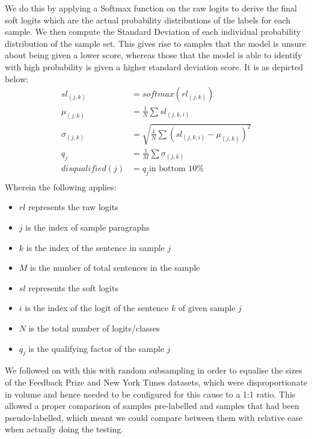 \documentclass[12pt]{article}
\begin{document}
{We do this by applying a Softmax function on the raw logits to derive the final soft logits which are the actual probability distributions of the labels for each sample. We then compute the Standard Deviation of each individual probability distribution of the sample set. This gives rise to samples that the model is unsure about being given a lower score, whereas those that the model is able to identify with high probability is given a higher standard deviation score. It is as depicted below:
\begin{align*}
    sl_{(j,k)} &= softmax(rl_{(j,k)}) \\
    \mu_{(j,k)} &= \frac{1}{N} \sum sl_{(j,k,i)} \\
    \sigma_{(j,k)} &= \sqrt{\frac{1}{N} \sum \left(sl_{(j,k,i)} - \mu_{(j,k)} \right)^2} \\
    q_j &= \frac{1}{M} \sum \sigma_{(j, k)} \\
    disqualified(j) &= q_j \text{in bottom 10\%} \\
\end{align*}
Wherein the following applies:
\begin{multicols}{2}
\begin{itemize}
    \item $rl$ represents the raw logits
    \item $j$ is the index of sample paragraphs
    \item $k$ is the index of the sentence in sample $j$
    \item $M$ is the number of total sentences in the sample
    \item $sl$ represents the soft logits
    \item $i$ is the index of the logit of the sentence $k$ of given sample $j$
    \item $N$ is the total number of logits/classes
    \item $q_j$ is the qualifying factor of the sample $j$
\end{itemize}
\end{multicols}

We followed on with this with random subsampling in order to equalise the sizes of the Feedback Prize and New York Times datasets, which were disproportionate in volume and hence needed to be configured for this cause to a 1:1 ratio. This allowed a proper comparison of samples pre-labelled and samples that had been pseudo-labelled, which meant we could compare between them with relative ease when actually doing the testing. 

}
\end{document}
